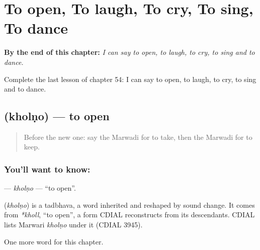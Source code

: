 
\chapter{To open, To laugh, To cry, To sing, To dance}
\label{ch:mw-to-open-to-laugh-to-cry-to-sing-to-dance}

\begin{chapteropening}
\textbf{By the end of this chapter:} \emph{I can say to open, to laugh, to cry, to sing and to dance.}

Complete the last lesson of chapter 54: I can say to open, to laugh, to cry, to sing and to dance.
\end{chapteropening}

\section[\texorpdfstring{\mw{खोलणो} (kholṇo)}{खोलणो (kholṇo)}]{ (kholṇo) — to open}

\label{lesson:MW-C54-kholno}



\begin{quote}
Before the new one: say the Marwadi for to take, then the Marwadi for to keep.
\end{quote}

\subsection*{You'll want to know: }
\textbf{} — \emph{kholṇo} — \textquotedblleft{}to open\textquotedblright{}.

\begin{cousinweb}
\textbf{} (\emph{kholṇo}) is a tadbhava, a word inherited and reshaped by sound change. It comes from \emph{*kholl}, \textquotedblleft{}to open\textquotedblright{}, a form CDIAL reconstructs from its descendants. CDIAL lists Marwari \emph{kholṇo} under it (CDIAL 3945).
\end{cousinweb}

\begin{grammarlens}[title={What you've built}]
One more word for this chapter.
\end{grammarlens}

